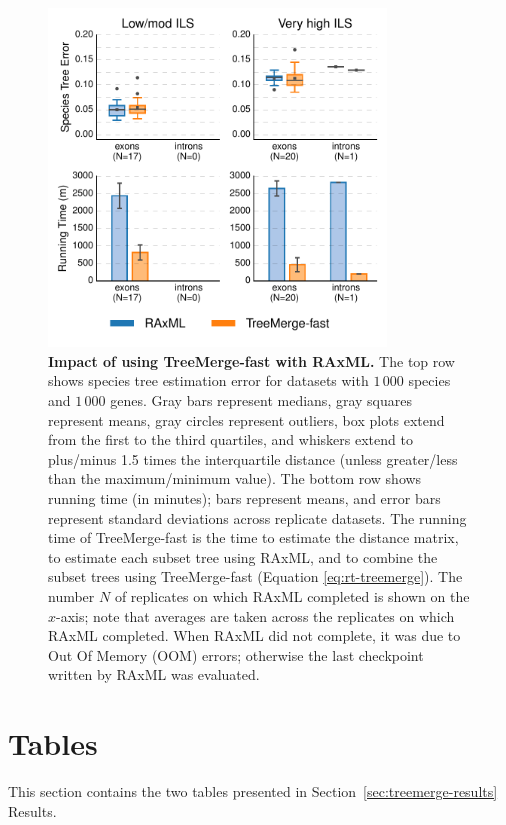 
\begin{figure}[!h]
\centering
\includegraphics[width=0.8\textwidth]{figures/treemerge-fig5.pdf}
\caption{
{\bf Impact of using TreeMerge-fast with RAxML. }
The top row shows species tree estimation error for datasets with  $1\,000$ species and  $1\,000$ genes. 
Gray bars represent medians, gray squares represent means, gray circles represent outliers, box plots extend from the first to the third quartiles, and whiskers extend to plus/minus 1.5 times the interquartile distance (unless greater/less than the maximum/minimum value).
The bottom row shows running time (in minutes); bars represent means, and error bars represent standard deviations across replicate datasets.
The running time of TreeMerge-fast is the time to estimate the distance matrix, to estimate each subset tree using RAxML, and to combine the subset trees using TreeMerge-fast (Equation \ref{eq:rt-treemerge}).
The number $N$ of replicates on which RAxML completed is shown on the $x$-axis; note that averages are taken across the replicates on which RAxML completed.
When RAxML did not complete, it was due to Out Of Memory (OOM) errors; otherwise the last checkpoint written by RAxML was evaluated.
}
\label{fig:raxml}
\end{figure}

\clearpage

\section{Tables}
\label{sec:treemerge-tables}
This section contains the two tables presented in Section~\ref{sec:treemerge-results} Results.

